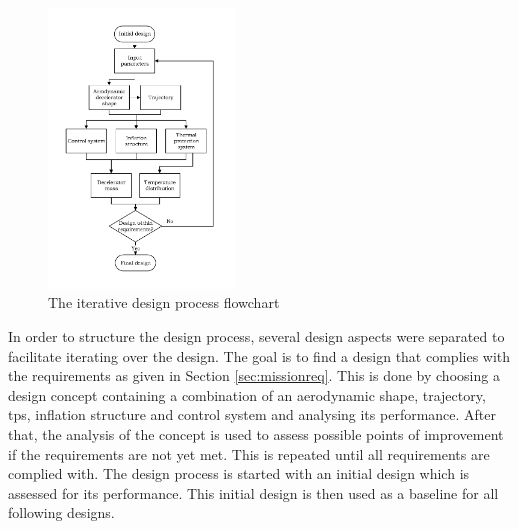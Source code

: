 \begin{figure}
	\includegraphics[width=0.44\textwidth]{./Figure/DesignIterationPhilosophy_new_cropped.pdf}
	\caption{The iterative design process flowchart}
	\label{fig:iterativedesignflowchart}		
\end{figure}

In order to structure the design process, several design aspects were separated to facilitate  iterating over the design. The goal is to find a design that complies with the requirements as given in Section \ref{sec:missionreq}. This is done by choosing a design concept containing a combination of an aerodynamic shape, trajectory, \gls{tps}, inflation structure and control system and analysing its performance. After that, the analysis of the concept is used to assess possible points of improvement if the requirements are not yet met. This is repeated until all requirements are complied with. The design process is started with an initial design which is assessed for its performance. This initial design is then used as a baseline for all following designs.

